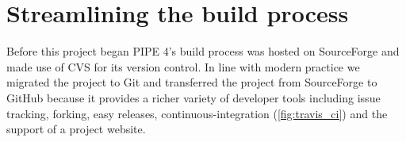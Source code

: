 \section{Streamlining the build process}
Before this project began PIPE 4's build process was hosted on SourceForge and made use of CVS for its version control. In line with modern practice we migrated the project to Git and transferred the project from SourceForge to GitHub because it provides a richer variety of developer tools including issue tracking, forking, easy releases, continuous-integration (\cref{fig:travis_ci}) and the support of a project website.





